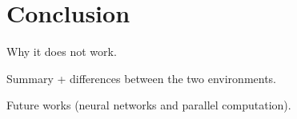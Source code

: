 \section{Conclusion}
Why it does not work.

Summary + differences between the two environments.

Future works (neural networks and parallel computation).
